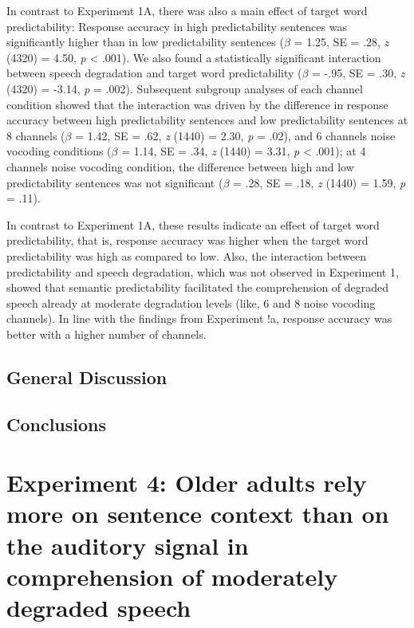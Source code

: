 \documentclass[a4paper, nobind]{templates/ociamthesis}
\begin{document}
In contrast to Experiment 1A, there was also a main effect of target word predictability:
Response accuracy in high predictability sentences was significantly higher than in low predictability sentences (\(\beta\) = 1.25, SE = .28, \emph{z} (4320) = 4.50, \emph{p} \textless{} .001).
We also found a statistically significant interaction between speech degradation and target word predictability (\(\beta\) = -.95, SE = .30, \emph{z} (4320) = -3.14, \emph{p} = .002).
Subsequent subgroup analyses of each channel condition showed that the interaction was driven by the difference in response accuracy between high predictability sentences and low predictability sentences at 8 channels (\(\beta\) = 1.42, SE = .62, \emph{z} (1440) = 2.30, \emph{p} = .02), and 6 channels noise vocoding conditions (\(\beta\) = 1.14, SE = .34, \emph{z} (1440) = 3.31, \emph{p} \textless{} .001);
at 4 channels noise vocoding condition, the difference between high and low predictability sentences was not significant (\(\beta\) = .28, SE = .18, \emph{z} (1440) = 1.59, \emph{p} = .11).

In contrast to Experiment 1A, these results indicate an effect of target word predictability, that is, response accuracy was higher when the target word predictability was high as compared to low.
Also, the interaction between predictability and speech degradation, which was not observed in Experiment 1, showed that semantic predictability facilitated the comprehension of degraded speech already at moderate degradation levels (like, 6 and 8 noise vocoding channels).
In line with the findings from Experiment !a, response accuracy was better with a higher number of channels.

\hypertarget{general-discussion-1}{%
\section{General Discussion}\label{general-discussion-1}}

\hypertarget{conclusions-1}{%
\section{Conclusions}\label{conclusions-1}}

\hypertarget{experiment-4-older-adults-rely-more-on-sentence-context-than-on-the-auditory-signal-in-comprehension-of-moderately-degraded-speech}{%
\chapter{Experiment 4: Older adults rely more on sentence context than on the auditory signal in comprehension of moderately degraded speech}\label{experiment-4-older-adults-rely-more-on-sentence-context-than-on-the-auditory-signal-in-comprehension-of-moderately-degraded-speech}}
\end{document}
